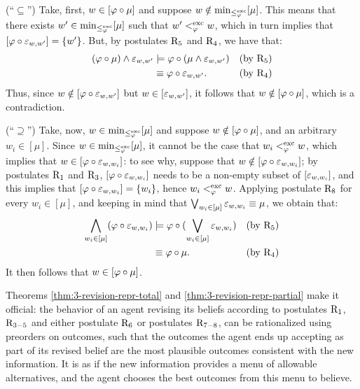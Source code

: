 \begin{prf*}{}{}
	(``$\subseteq$'') 
	Take, first, $w\in[\varphi\circ\mu]$ and suppose $w\notin{\operatorname{min}}_{\le^{\operatorname{exc}}_\varphi}[\mu]$.
	This means that there exists $w'\in{\operatorname{min}}_{\le^{\operatorname{exc}}_\varphi}[\mu]$ such that $w'<^{\operatorname{exc}}_\varphi w$,
	which in turn implies that $[\varphi\circ\varepsilon_{w,w'}]=\{w'\}$.
	But, by postulates $\mathrm{R}_{5}$ and $\mathrm{R}_{4}$, we have that:
	\begin{align*}
		(\varphi\circ\mu)\land\varepsilon_{w,w'} & \models\varphi\circ(\mu\land\varepsilon_{w,w'}) &(\text{by}~\mathrm{R}_{5})\\
										 & \equiv\varphi\circ\varepsilon_{w,w'}.		   &(\text{by}~\mathrm{R}_{4})
	\end{align*}
	Thus, since $w\notin[\varphi\circ\varepsilon_{w,w'}]$ but $w\in[\varepsilon_{w,w'}]$, it follows that $w\notin[\varphi\circ\mu]$,
	which is a contradiction.

	(``$\supseteq$'') 
	Take, now, $w\in{\operatorname{min}}_{\le^{\operatorname{exc}}_\varphi}[\mu]$ and suppose $w\notin[\varphi\circ\mu]$,
	and an arbitrary $w_i\in[\mu]$. Since $w\in{\operatorname{min}}_{\le^{\operatorname{exc}}_\varphi}[\mu]$,
	it cannot be the case that $w_i<^{\operatorname{exc}}_\varphi w$, which implies that 
	$w\in[\varphi\circ\varepsilon_{w,w_i}]$:
	to see why, suppose that $w\notin[\varphi\circ\varepsilon_{w,w_i}]$;
	by postulates $\mathrm{R}_{1}$ and $\mathrm{R}_{3}$, $[\varphi\circ\varepsilon_{w,w_i}]$ 
	needs to be a non-empty subset 
	of $[\varepsilon_{w,w_i}]$, 
	and this implies that $[\varphi\circ\varepsilon_{w,w_i}]=\{w_i\}$,
	hence $w_i<^{{\operatorname{exc}}}_{\varphi}w$.
	Applying postulate $\mathrm{R}_{8}$ for every $w_i\in[\mu]$, 
	and keeping in mind that $\bigvee_{w_i\in[\mu]}\varepsilon_{w,w_i}\equiv\mu$,
	we obtain that:
	\begin{align*}
		\bigwedge_{w_i\in[\mu]}(\varphi\circ\varepsilon_{w,w_i}) 		& 
		\models\varphi\circ(\bigvee_{w_i\in[\mu]}\varepsilon_{w,w_i}) 	&
		(\text{by}~\mathrm{R}_{5})										\\
																& 
		\equiv\varphi\circ\mu.                                       &
		(\text{by}~\mathrm{R}_{4})										\\ 
	\end{align*}
	It then follows that $w\in[\varphi\circ\mu]$.
\end{prf*}

Theorems \ref{thm:3-revision-repr-total} and \ref{thm:3-revision-repr-partial}
make it official:
the behavior of an agent revising its beliefs according to postulates $\mathrm{R}_{1}$, $\mathrm{R}_{3-5}$
and either postulate $\mathrm{R}_{6}$ or postulates $\mathrm{R}_{7-8}$,
can be rationalized using preorders on outcomes, such that the outcomes the agent 
ends up accepting as part of its revised belief are the most plausible outcomes
consistent with the new information.
It is as if the new information provides a menu of allowable alternatives, 
and the agent chooses the best outcomes from this menu to believe.

